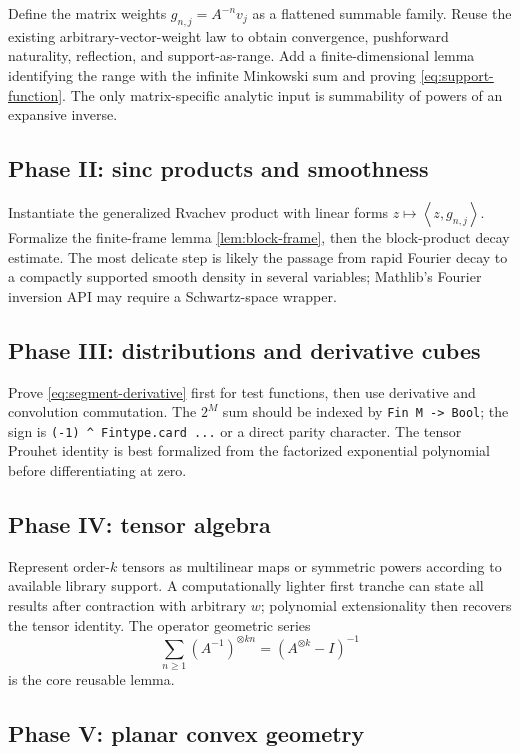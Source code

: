 \documentclass[11pt,oneside]{article}
\theoremstyle{definition}
\theoremstyle{remark}
\newcommand{\ip}[2]{\left\langle #1,#2\right\rangle}
\begin{document}
Define the matrix weights $g_{n,j}=A^{-n}v_j$ as a flattened summable family.
Reuse the existing arbitrary-vector-weight law to obtain convergence, pushforward
naturality, reflection, and support-as-range.  Add a finite-dimensional lemma
identifying the range with the infinite Minkowski sum and proving
\eqref{eq:support-function}.  The only matrix-specific analytic input is
summability of powers of an expansive inverse.

\subsection{Phase II: sinc products and smoothness}

Instantiate the generalized Rvachev product with linear forms
$z\mapsto\ip{z}{g_{n,j}}$.  Formalize the finite-frame lemma
\cref{lem:block-frame}, then the block-product decay estimate.  The most delicate
step is likely the passage from rapid Fourier decay to a compactly supported
smooth density in several variables; Mathlib's Fourier inversion API may require
a Schwartz-space wrapper.

\subsection{Phase III: distributions and derivative cubes}

Prove \eqref{eq:segment-derivative} first for test functions, then use derivative
and convolution commutation.  The $2^M$ sum should be indexed by
\verb|Fin M -> Bool|; the sign is \verb|(-1) ^ Fintype.card ...| or a direct
parity character.  The tensor Prouhet identity is best formalized from the
factorized exponential polynomial before differentiating at zero.

\subsection{Phase IV: tensor algebra}

Represent order-$k$ tensors as multilinear maps or symmetric powers according to
available library support.  A computationally lighter first tranche can state
all results after contraction with arbitrary $w$; polynomial extensionality then
recovers the tensor identity.  The operator geometric series
\[
 \sum_{n\ge1}(A^{-1})^{\otimes k n}=(A^{\otimes k}-I)^{-1}
\]
is the core reusable lemma.

\subsection{Phase V: planar convex geometry}
\end{document}
